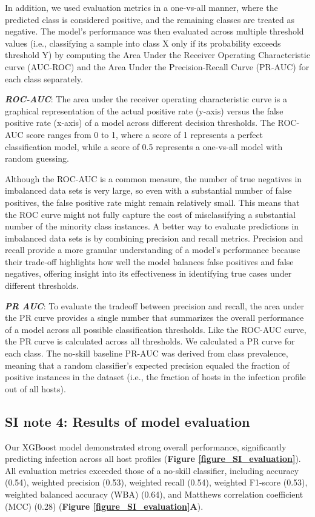 \documentclass[oneside, a4paper, onecolumn, 11pt]{article}
\begin{document}
In addition, we used evaluation metrics in a one-vs-all manner, where the predicted class is considered positive, and the remaining classes are treated as negative. The model's performance was then evaluated across multiple threshold values (i.e., classifying a sample into class X only if its probability exceeds threshold Y) by computing the Area Under the Receiver Operating Characteristic curve (AUC-ROC) and the Area Under the Precision-Recall Curve (PR-AUC) for each class separately.

\textbf{\textit{ROC-AUC}}: The area under the receiver operating characteristic curve is a graphical representation of the actual positive rate (y-axis) versus the false positive rate (x-axis) of a model across different decision thresholds. The ROC-AUC score ranges from 0 to 1, where a score of 1 represents a perfect classification model, while a score of 0.5 represents a one-vs-all model with random guessing.

Although the ROC-AUC is a common measure, the number of true negatives in imbalanced data sets is very large, so even with a substantial number of false positives, the false positive rate might remain relatively small. This means that the ROC curve might not fully capture the cost of misclassifying a substantial number of the minority class instances. A better way to evaluate predictions in imbalanced data sets is by combining precision and recall metrics. Precision and recall provide a more granular understanding of a model's performance because their trade-off highlights how well the model balances false positives and false negatives, offering insight into its effectiveness in identifying true cases under different thresholds.

\textbf{\textit{PR AUC}}: To evaluate the tradeoff between precision and recall, the area under the PR curve provides a single number that summarizes the overall performance of a model across all possible classification thresholds. Like the ROC-AUC curve, the PR curve is calculated across all thresholds. We calculated a PR curve for each class. The no-skill baseline PR-AUC was derived from class prevalence, meaning that a random classifier’s expected precision equaled the fraction of positive instances in the dataset (i.e., the fraction of hosts in the infection profile out of all hosts).

\clearpage

\subsection*{SI note 4: Results of model evaluation}
Our XGBoost model demonstrated strong overall performance, significantly predicting infection across all host profiles (\textbf{Figure \ref{figure_SI_evaluation}}). All evaluation metrics exceeded those of a no-skill classifier, including accuracy (0.54), weighted precision (0.53), weighted recall (0.54), weighted F1-score (0.53), weighted balanced accuracy (WBA) (0.64), and Matthews correlation coefficient (MCC) (0.28) (\textbf{Figure \ref{figure_SI_evaluation}A}).
\end{document}
